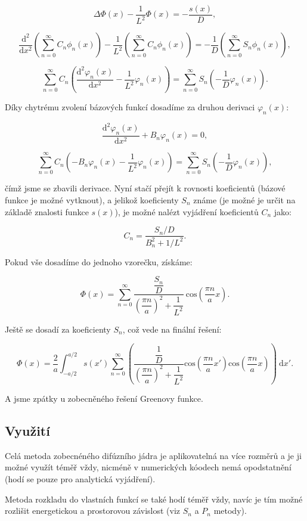 $$ \Delta \Phi(x) - \dfrac{1}{L^2} \Phi(x) = - \dfrac{s(x)}{D}, $$

$$ \dfrac{\text{d}^2}{\text{d}x^2} \left( \sum_{n=0}^{\infty} C_n \phi_n(x) \right) - \dfrac{1}{L^2} \left( \sum_{n=0}^{\infty} C_n \phi_n(x) \right) = - \dfrac{1}{D} \left( \sum_{n=0}^{\infty} S_n \phi_n(x) \right), $$

$$ \sum_{n=0}^{\infty} C_n \left( \dfrac{\text{d}^2 \varphi_n(x)}{\text{d}x^2} - \dfrac{1}{L^2} \varphi_n(x) \right) = \sum_{n=0}^{\infty} S_n \left(- \dfrac{1}{D} \varphi_n(x) \right). $$

Díky chytrému zvolení bázových funkcí dosadíme za druhou derivaci $\varphi_n(x)$:

$$ \dfrac{\text{d}^2 \varphi_n(x)}{\text{d}x^2} + B_n \varphi_n(x) = 0, $$

$$ \sum_{n=0}^{\infty} C_n \left( -B_n \varphi_n(x) - \dfrac{1}{L^2} \varphi_n(x) \right) = \sum_{n=0}^{\infty} S_n \left(- \dfrac{1}{D} \varphi_n(x) \right), $$

čímž jsme se zbavili derivace. Nyní stačí přejít k rovnosti koeficientů (bázové funkce je možné vytknout), a jelikož koeficienty $S_n$ známe (je možné je určit na základě znalosti funkce $s(x)$), je možné nalézt vyjádření koeficientů $C_n$ jako:

$$ C_n = \dfrac{S_n/D}{B_n^2 + 1/L^2}. $$

Pokud vše dosadíme do jednoho vzorečku, získáme:

$$\Phi(x) = \sum_{n=0}^{\infty} \dfrac{\dfrac{S_n}{D}}{\left(\dfrac{\pi n}{a} \right)^2 + \dfrac{1}{L^2}} \: \text{cos} \left( \dfrac{\pi n}{a} x\right). $$

Ještě se dosadí za koeficienty $S_n$, což vede na finální řešení:

$$ \boxed{ \Phi(x) = \dfrac{2}{a}  \int_{-a/2}^{a/2} s(x') \sum_{n=0}^{\infty}\left( \dfrac{\dfrac{1}{D}}{\left(\dfrac{\pi n}{a} \right)^2 + \dfrac{1}{L^2}} \text{cos} \left( \dfrac{\pi n}{a} x'\right) \text{cos} \left( \dfrac{\pi n}{a} x\right) \right) \: \text{d}x'.} $$

A jsme zpátky u zobecněného řešení Greenovy funkce.

\subsection{Využití}

Celá metoda zobecnéného difúzního jádra je aplikovatelná na více rozměrů a je ji možné využít téměř vždy, nicméně v numerických kóodech nemá opodstatnění (hodí se pouze pro analytická vyjádření).

Metoda rozkladu do vlastních funkcí se také hodí téměř vždy, navíc je tím možné rozlišit energetickou a prostorovou závislost (viz $S_n$ a $P_n$ metody).